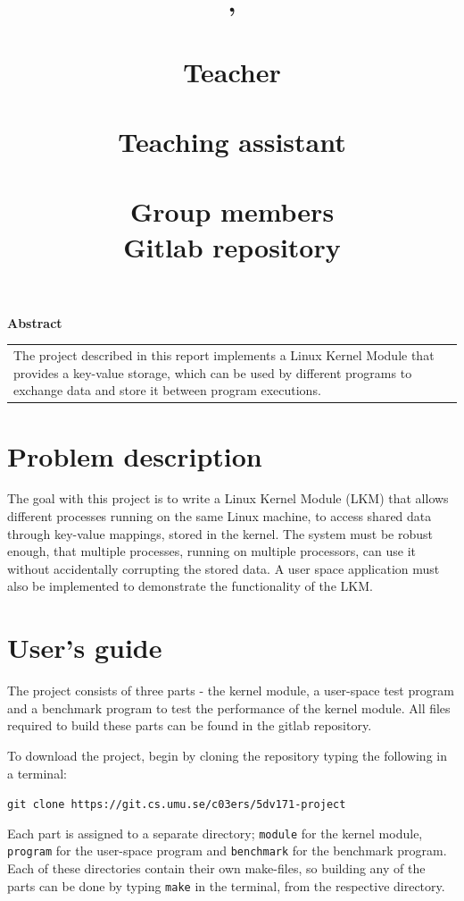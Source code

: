 \documentclass[final,a4paper]{article}
\title{
  \pagenumbering{gobble}
  \begin{center}
  {\LARGE \bf \course{}, \semester}\\
  {\Large \bf \assignment}\\
  \vspace{6em}
  {\normalsize
  {\bf Teacher}\\
  {\lecturer}\vspace{1em}\\
  {\bf Teaching assistant}\\
  {\assistants}\vspace{1em}\\
  {\bf Group members}\\
  \authors
  {\bf Gitlab repository}\vspace{-1em}\\
  {\codebase}}
  \end{center}
  \vspace{3em}
}
\author{}
\date{}
\newcommand{\codebase}{https://git.cs.umu.se/c03ers/5dv171-project}
\begin{document}
\maketitle
  \begin{center}
  {\bf Abstract }\\
  \vspace{0.5em}
  \begin{tabular}{ p{25em} }
  \hline
  \vspace{0.0em}
  The project described in this report implements a Linux Kernel Module
  that provides a key-value storage, which can be used by different programs
  to exchange data and store it between program executions.\vspace{0.7em}\\
  \end{tabular}
  \end{center}
\pagebreak
{}
\section*{Problem description}
The goal with this project is to write a Linux Kernel Module (LKM) that allows
different processes running on the same Linux machine, to access shared data
through key-value mappings, stored in the kernel. The system must be robust
enough, that multiple processes, running on multiple processors, can use it
without accidentally corrupting the stored data. A user space application must
also be implemented to demonstrate the functionality of the LKM.

\section*{User's guide}
The project consists of three parts - the kernel module, a user-space
test program and a benchmark program to test the performance of the kernel
module. All files required to build these parts can be found in the gitlab
repository.

To download the project, begin by cloning the repository typing the following in
a terminal:
\begin{center}
{\tt git clone \codebase}
\end{center}

Each part is assigned to a separate directory; \texttt{module} for the kernel
module, \texttt{program} for the user-space program and \texttt{benchmark}
for the benchmark program. Each of these directories contain their own
make-files, so building any of the parts can be done by typing
\texttt{make} in the terminal, from the respective directory.
\end{document}
